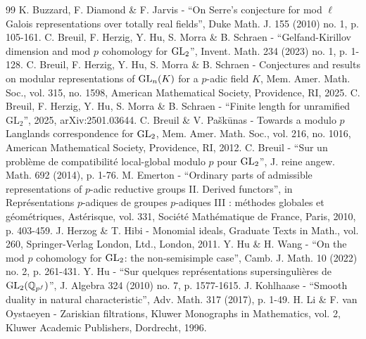 \begin{thebibliography}{99}
 K. Buzzard, F. Diamond \& F. Jarvis - “On Serre’s conjecture for mod $\ell $ Galois representations over totally real fields”, Duke Math. J. 155 (2010) no. 1, p. 105-161.
 C. Breuil, F. Herzig, Y. Hu, S. Morra \& B. Schraen - “Gelfand-Kirillov dimension and mod $p$ cohomology for $\rm GL_2$”, Invent. Math. 234 (2023) no. 1, p. 1-128.
 C. Breuil, F. Herzig, Y. Hu, S. Morra \& B. Schraen - Conjectures and results on modular representations of ${\rm GL}_n({K})$ for a $p$-adic field ${K}$, Mem. Amer. Math. Soc., vol. 315, no. 1598, American Mathematical Society, Providence, RI, 2025.
 C. Breuil, F. Herzig, Y. Hu, S. Morra \& B. Schraen - “Finite length for unramified $\mathrm{GL}_2$”, 2025, arXiv:2501.03644.
 C. Breuil \& V. Paškūnas - Towards a modulo $p$ Langlands correspondence for ${\rm GL}_2$, Mem. Amer. Math. Soc., vol. 216, no. 1016, American Mathematical Society, Providence, RI, 2012.
 C. Breuil - “Sur un problème de compatibilité local-global modulo $p$ pour ${\rm GL}_2$”, J. reine angew. Math. 692 (2014), p. 1-76.
 M. Emerton - “Ordinary parts of admissible representations of $p$-adic reductive groups II. Derived functors”, in Représentations $p$-adiques de groupes $p$-adiques III : méthodes globales et géométriques, Astérisque, vol. 331, Société Mathématique de France, Paris, 2010, p. 403-459.
 J. Herzog \& T. Hibi - Monomial ideals, Graduate Texts in Math., vol. 260, Springer-Verlag London, Ltd., London, 2011.
 Y. Hu \& H. Wang - “On the mod $p$ cohomology for $\rm GL_2$: the non-semisimple case”, Camb. J. Math. 10 (2022) no. 2, p. 261-431.
 Y. Hu - “Sur quelques représentations supersingulières de ${\rm GL}_2(\mathbb{Q}_{p^f})$”, J. Algebra 324 (2010) no. 7, p. 1577-1615.
 J. Kohlhaase - “Smooth duality in natural characteristic”, Adv. Math. 317 (2017), p. 1-49.
 H. Li \& F. van Oystaeyen - Zariskian filtrations, Kluwer Monographs in Mathematics, vol. 2, Kluwer Academic Publishers, Dordrecht, 1996.
\end{thebibliography}

